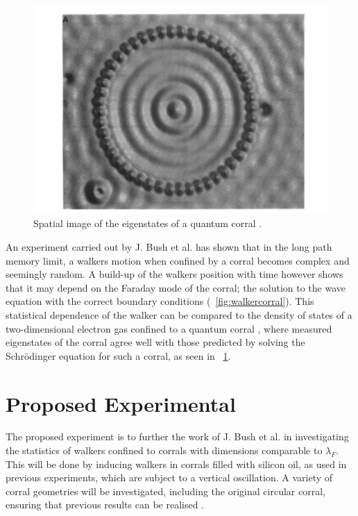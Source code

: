 \documentclass[11pt,twocolumn]{article}
\newcommand{\figref}[2][\figurename~]{#1\ref{#2}}
\begin{document}
\begin{figure}[h]
	\includegraphics[width=\columnwidth]{ElectronCorral.pdf}
	\caption{Spatial image of the eigenstates of a quantum corral \cite{21}.}
	\label{fig:electroncorral}
\end{figure}

An experiment carried out by J. Bush et al. \cite{12} has shown that in the long path memory limit, a walkers motion when confined by a corral becomes complex and seemingly random.  A build-up of the walkers position with time however shows that it may depend on the Faraday mode of the corral; the solution to the wave equation with the correct boundary conditions (\figref{fig:walkercorral}).  This statistical dependence of the walker can be compared to the density of states of a two-dimensional electron gas confined to a quantum corral \cite{21}, where measured eigenstates of the corral agree well with those predicted by solving the Schr{\"o}dinger equation for such a corral, as seen in \figref{fig:electroncorral}.

\section{Proposed Experimental}
\label{sec:proposedexperiment}
The proposed experiment is to further the work of J. Bush et al. in investigating the statistics of walkers confined to corrals with dimensions comparable to $\lambda_F$.  This will be done by inducing walkers in corrals filled with silicon oil, as used in previous experiments, which are subject to a vertical oscillation.  A variety of corral geometries will be investigated, including the original circular corral, ensuring that previous results can be realised \cite{12}.
\end{document}
